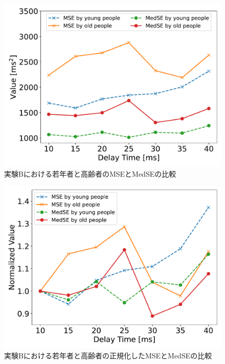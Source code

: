 \begin{figure}[tbp]
  \centering
  \includegraphics[scale=0.5]{figures/Honbann/Comparison_young_old/40_MSE-MedSE.pdf}
  \caption{実験Bにおける若年者と高齢者のMSEとMedSEの比較}
  \label{fig:40ms_MSE_MedSE}
\end{figure}

\begin{figure}[tbp]
  \centering
  \includegraphics[scale=0.5]{figures/Honbann/Comparison_young_old/40_MSE-MedSE_normalized.pdf}
  \caption{実験Bにおける若年者と高齢者の正規化したMSEとMedSEの比較}
  \label{fig:Normalized_40ms_MSE_MedSE}
\end{figure}
